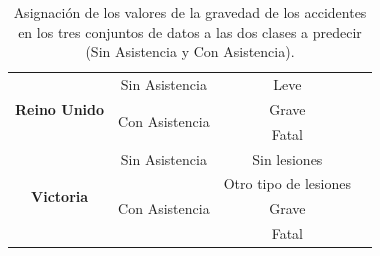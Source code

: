 \documentclass{uathesis-es}
\begin{document}
{\begin{table}[H]
\begin{center}
\begin{tabular}{|c|c||c|c|}
					\multirow{3}{*}{\textbf{Reino Unido}} &
					Sin Asistencia & Leve \\ \cline{2-3} &
					\multirow{2}{*}{Con Asistencia} & Grave \\ &
					& Fatal  \\ \hline
					\hline
					
					\multirow{4}{*}{\textbf{Victoria}} &
					Sin Asistencia & Sin lesiones \\ \cline{2-3} &
					\multirow{3}{*}{Con Asistencia} & Otro tipo de lesiones \\ &
					& Grave  \\ &
					& Fatal \\ \hline
					\hline
					
				\end{tabular}
			\end{center}
			\caption{Asignación de los valores de la gravedad de los accidentes en los tres conjuntos de datos a las dos clases a predecir (Sin Asistencia y Con Asistencia).}
			\label{MAPPING_ASSISTANCE}
		\end{table}
		
		
		
}
\end{document}
